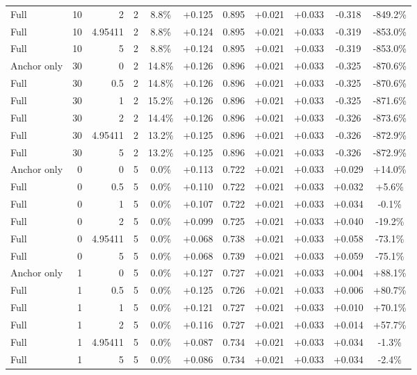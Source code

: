 \begin{table}[htbp]
\begin{tabular}{lrrrccccccc}
Full & 10 & 2 & 2 & 8.8\% & +0.125 & 0.895 & +0.021 & +0.033 & -0.318 & -849.2\% \\
Full & 10 & 4.95411 & 2 & 8.8\% & +0.124 & 0.895 & +0.021 & +0.033 & -0.319 & -853.0\% \\
Full & 10 & 5 & 2 & 8.8\% & +0.124 & 0.895 & +0.021 & +0.033 & -0.319 & -853.0\% \\
Anchor only & 30 & 0 & 2 & 14.8\% & +0.126 & 0.896 & +0.021 & +0.033 & -0.325 & -870.6\% \\
Full & 30 & 0.5 & 2 & 14.8\% & +0.126 & 0.896 & +0.021 & +0.033 & -0.325 & -870.6\% \\
Full & 30 & 1 & 2 & 15.2\% & +0.126 & 0.896 & +0.021 & +0.033 & -0.325 & -871.6\% \\
Full & 30 & 2 & 2 & 14.4\% & +0.126 & 0.896 & +0.021 & +0.033 & -0.326 & -873.6\% \\
Full & 30 & 4.95411 & 2 & 13.2\% & +0.125 & 0.896 & +0.021 & +0.033 & -0.326 & -872.9\% \\
Full & 30 & 5 & 2 & 13.2\% & +0.125 & 0.896 & +0.021 & +0.033 & -0.326 & -872.9\% \\
Anchor only & 0 & 0 & 5 & 0.0\% & +0.113 & 0.722 & +0.021 & +0.033 & +0.029 & +14.0\% \\
Full & 0 & 0.5 & 5 & 0.0\% & +0.110 & 0.722 & +0.021 & +0.033 & +0.032 & +5.6\% \\
Full & 0 & 1 & 5 & 0.0\% & +0.107 & 0.722 & +0.021 & +0.033 & +0.034 & -0.1\% \\
Full & 0 & 2 & 5 & 0.0\% & +0.099 & 0.725 & +0.021 & +0.033 & +0.040 & -19.2\% \\
Full & 0 & 4.95411 & 5 & 0.0\% & +0.068 & 0.738 & +0.021 & +0.033 & +0.058 & -73.1\% \\
Full & 0 & 5 & 5 & 0.0\% & +0.068 & 0.739 & +0.021 & +0.033 & +0.059 & -75.1\% \\
Anchor only & 1 & 0 & 5 & 0.0\% & +0.127 & 0.727 & +0.021 & +0.033 & +0.004 & +88.1\% \\
Full & 1 & 0.5 & 5 & 0.0\% & +0.125 & 0.726 & +0.021 & +0.033 & +0.006 & +80.7\% \\
Full & 1 & 1 & 5 & 0.0\% & +0.121 & 0.727 & +0.021 & +0.033 & +0.010 & +70.1\% \\
Full & 1 & 2 & 5 & 0.0\% & +0.116 & 0.727 & +0.021 & +0.033 & +0.014 & +57.7\% \\
Full & 1 & 4.95411 & 5 & 0.0\% & +0.087 & 0.734 & +0.021 & +0.033 & +0.034 & -1.3\% \\
Full & 1 & 5 & 5 & 0.0\% & +0.086 & 0.734 & +0.021 & +0.033 & +0.034 & -2.4\% \\

\end{tabular}
\end{table}

